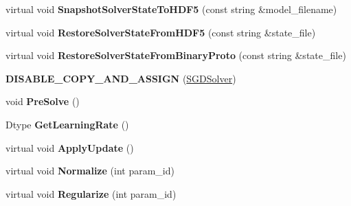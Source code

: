 \begin{DoxyCompactItemize}
\item 
\mbox{\label{classcaffe_1_1_s_g_d_solver_ad503803863708ade3162fd5d9225b9f5}} 
virtual void {\bfseries Snapshot\+Solver\+State\+To\+H\+D\+F5} (const string \&model\+\_\+filename)
\item 
\mbox{\label{classcaffe_1_1_s_g_d_solver_a5b959d966140b52c492a5096aa72ee84}} 
virtual void {\bfseries Restore\+Solver\+State\+From\+H\+D\+F5} (const string \&state\+\_\+file)
\item 
\mbox{\label{classcaffe_1_1_s_g_d_solver_aa6ecd70cde5d5e9cf24e0d275200fbac}} 
virtual void {\bfseries Restore\+Solver\+State\+From\+Binary\+Proto} (const string \&state\+\_\+file)
\item 
\mbox{\label{classcaffe_1_1_s_g_d_solver_a4b37f2267ebd84e62ee486470b2b0c2b}} 
{\bfseries D\+I\+S\+A\+B\+L\+E\+\_\+\+C\+O\+P\+Y\+\_\+\+A\+N\+D\+\_\+\+A\+S\+S\+I\+GN} (\mbox{\hyperlink{classcaffe_1_1_s_g_d_solver}{S\+G\+D\+Solver}})
\item 
\mbox{\label{classcaffe_1_1_s_g_d_solver_a6488286ff665df1907d64a92d4acf835}} 
void {\bfseries Pre\+Solve} ()
\item 
\mbox{\label{classcaffe_1_1_s_g_d_solver_a985436c42815498163a3d74fdb64ee70}} 
Dtype {\bfseries Get\+Learning\+Rate} ()
\item 
\mbox{\label{classcaffe_1_1_s_g_d_solver_a48085c44645f4e6acce5aed04f769e76}} 
virtual void {\bfseries Apply\+Update} ()
\item 
\mbox{\label{classcaffe_1_1_s_g_d_solver_a4d5b6dbfb77bdb068de80ff2aeef8761}} 
virtual void {\bfseries Normalize} (int param\+\_\+id)
\item 
\mbox{\label{classcaffe_1_1_s_g_d_solver_a8ec95e543c79037f3c8e60f7df3e1959}} 
virtual void {\bfseries Regularize} (int param\+\_\+id)
\item 
\mbox{\label{classcaffe_1_1_s_g_d_solver_a29f0660ce0719d863d84ea6111a6dfcf}} 

\end{DoxyCompactItemize}
